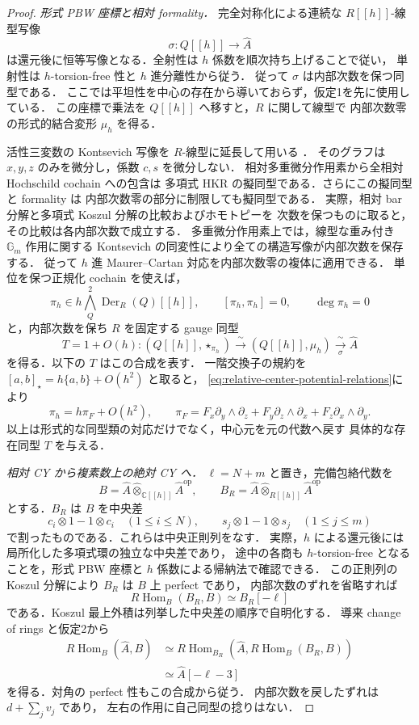 \begin{proof}
\emph{形式 PBW 座標と相対 formality．}
完全対称化による連続な $R[[h]]$-線型写像
\[
 \sigma:Q[[h]]\longrightarrow\widehat A
\]
は還元後に恒等写像となる．全射性は $h$ 係数を順次持ち上げることで従い，
単射性は $h$-torsion-free 性と $h$ 進分離性から従う．
従って $\sigma$ は内部次数を保つ同型である．
ここでは平坦性を中心の存在から導いておらず，仮定1を先に使用している．
この座標で乗法を $Q[[h]]$ へ移すと，$R$ に関して線型で
内部次数零の形式的結合変形 $\mu_h$ を得る．

活性三変数の Kontsevich 写像を $R$-線型に延長して用いる
\cite[\S4, \S6]{Kontsevich}．
そのグラフは $x,y,z$ のみを微分し，係数 $c,s$ を微分しない．
相対多重微分作用素から全相対 Hochschild cochain への包含は
多項式 HKR の擬同型である．さらにこの擬同型と formality は
内部次数零の部分に制限しても擬同型である．
実際，相対 bar 分解と多項式 Koszul 分解の比較およびホモトピーを
次数を保つものに取ると，その比較は各内部次数で成立する．
多重微分作用素上では，線型な重み付き $\mathbb G_m$ 作用に関する
Kontsevich の同変性により全ての構造写像が内部次数を保存する．
従って $h$ 進 Maurer--Cartan 対応を内部次数零の複体に適用できる．
単位を保つ正規化 cochain を使えば，
\begin{equation}\label{eq:relative-center-formality-identification}
 \pi_h\in h\bigwedge^2_Q\operatorname{Der}_R(Q)[[h]],\qquad
 [\pi_h,\pi_h]=0,\qquad\deg\pi_h=0
\end{equation}
と，内部次数を保ち $R$ を固定する gauge 同型
\[
 T=1+O(h):(Q[[h]],\star_{\pi_h})
       \xrightarrow{\ \sim\ }(Q[[h]],\mu_h)
       \xrightarrow[\sigma]{\ \sim\ }\widehat A
\]
を得る．以下の $T$ はこの合成を表す．
一階交換子の規約を $[a,b]_{\star}=h\{a,b\}+O(h^2)$ と取ると，
\eqref{eq:relative-center-potential-relations}により
\[
 \pi_h=h\pi_F+O(h^2),\qquad
 \pi_F=F_x\partial_y\wedge\partial_z
        +F_y\partial_z\wedge\partial_x
        +F_z\partial_x\wedge\partial_y .
\]
以上は形式的な同型類の対応だけでなく，中心元を元の代数へ戻す
具体的な存在同型 $T$ を与える．

\emph{相対 CY から複素数上の絶対 CY へ．}
$\ell=N+m$ と置き，完備包絡代数を
\[
 B=\widehat A\widehat\otimes_{\mathbb C[[h]]}\widehat A^{\mathrm{op}},
 \qquad
 B_R=\widehat A\widehat\otimes_{R[[h]]}\widehat A^{\mathrm{op}}
\]
とする．$B_R$ は $B$ を中央差
\[
 c_i\otimes1-1\otimes c_i\quad(1\le i\le N),\qquad
 s_j\otimes1-1\otimes s_j\quad(1\le j\le m)
\]
で割ったものである．これらは中央正則列をなす．
実際，$h$ による還元後には局所化した多項式環の独立な中央差であり，
途中の各商も $h$-torsion-free となることを，形式 PBW 座標と
$h$ 係数による帰納法で確認できる．
この正則列の Koszul 分解により $B_R$ は $B$ 上 perfect であり，
内部次数のずれを省略すれば
\[
 R\operatorname{Hom}_B(B_R,B)\simeq B_R[-\ell]
\]
である．Koszul 最上外積は列挙した中央差の順序で自明化する．
導来 change of rings と仮定2から
\[
 \begin{split}
 R\operatorname{Hom}_B(\widehat A,B)
 &\simeq R\operatorname{Hom}_{B_R}
       (\widehat A,R\operatorname{Hom}_B(B_R,B))\\
 &\simeq\widehat A[-\ell-3]
 \end{split}
\]
を得る．対角の perfect 性もこの合成から従う．
内部次数を戻したずれは $d+\sum_jv_j$ であり，
左右の作用に自己同型の捻りはない．


\end{proof}
